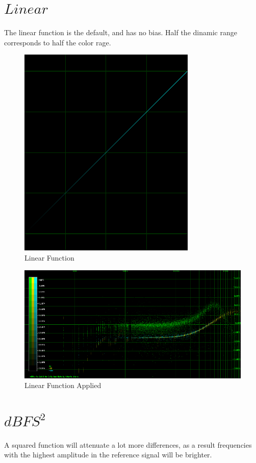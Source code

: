 \documentclass[10pt,a4paper]{report}
\begin{document}
\begin{appendices}
\newpage
\section{$Linear$} 

The linear function is the default, and has no bias. Half the dinamic range corresponds to half the color rage.

\begin{figure}[H]
	\centering
	\includegraphics[width=0.4\linewidth]{images/colorfilter/BetaFunctionPlot_3.png}
	\caption[Linear]{Linear Function}
	\label{fig:betafunctionplot3}
\end{figure}

\begin{figure}[H]
	\centering
	\includegraphics[width=1\linewidth]{images/colorfilter/BetaFunctionPlot_3_Data.png}
	\caption[Linear Applied]{Linear Function Applied}
	\label{fig:betafunctionplot3data}
\end{figure}

\newpage
\section{$dBFS^2$}

A squared function will attenuate a lot more differences, as a result frequencies with the highest amplitude in the reference signal will be brighter.


\end{appendices}
\end{document}
